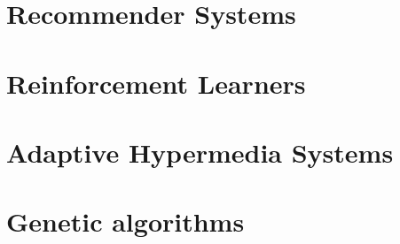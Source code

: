 \section{Recommender Systems}
\section{Reinforcement Learners}
\section{Adaptive Hypermedia Systems}
\section{Genetic algorithms}

